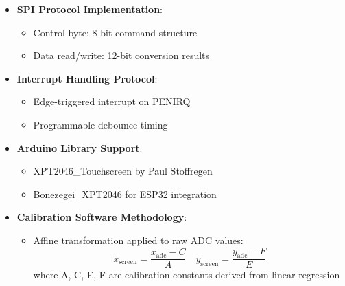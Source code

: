 \begin{itemize}
	\item \textbf{SPI Protocol Implementation}:
	\begin{itemize}
		\item Control byte: 8-bit command structure
		\item Data read/write: 12-bit conversion results
	\end{itemize}
	\item \textbf{Interrupt Handling Protocol}:
	\begin{itemize}
		\item Edge-triggered interrupt on PENIRQ
		\item Programmable debounce timing \cite{Stoffregen:2023}
	\end{itemize}
	\item \textbf{Arduino Library Support}:
	\begin{itemize}
		\item XPT2046\_Touchscreen by Paul Stoffregen \cite{Stoffregen:2023}
		\item Bonezegei\_XPT2046 for ESP32 integration \cite{batutay:2023}
	\end{itemize}
	\item \textbf{Calibration Software Methodology}:
	\begin{itemize}
		\item Affine transformation applied to raw ADC values:
		\begin{equation}
			x_{\text{screen}} = \frac{x_{\text{adc}} - C}{A} \quad y_{\text{screen}} = \frac{y_{\text{adc}} - F}{E}
		\end{equation}
		where A, C, E, F are calibration constants derived from linear regression \cite{Allelco:2023,xpt2046:2007}
	\end{itemize}
\end{itemize}

